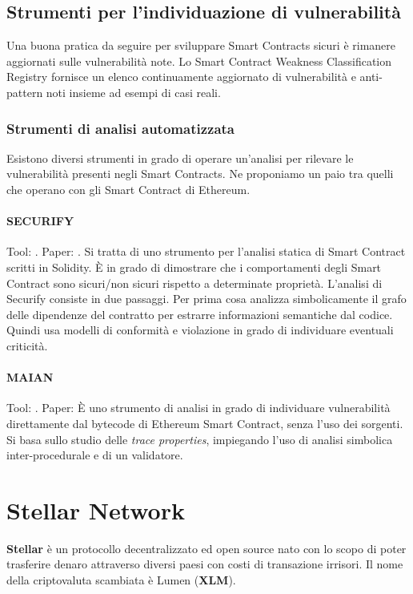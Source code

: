 \subsection{Strumenti per l'individuazione di vulnerabilità}
Una buona pratica da seguire per sviluppare Smart Contracts sicuri è
rimanere aggiornati sulle vulnerabilità note.
Lo Smart Contract Weakness Classification Registry \cite{swc-registry} fornisce un elenco
continuamente aggiornato di vulnerabilità e anti-pattern noti insieme ad esempi
di casi reali.

\subsubsection{Strumenti di analisi automatizzata}
Esistono diversi strumenti in grado di operare un'analisi per
rilevare le vulnerabilità presenti
negli Smart Contracts. Ne proponiamo un paio tra quelli che operano con
gli Smart Contract di Ethereum.

\paragraph{SECURIFY} Tool: \cite{secufiry-url}. Paper: \cite{secufiry-paper}.
Si tratta di uno strumento per l'analisi statica di Smart Contract scritti in Solidity. È in grado
di dimostrare che i comportamenti degli Smart Contract sono sicuri/non sicuri
rispetto a determinate proprietà.
L'analisi di Securify consiste in due passaggi.
Per prima cosa analizza simbolicamente il grafo delle dipendenze
del contratto per estrarre informazioni semantiche dal codice.
Quindi usa modelli di conformità e violazione
in grado di individuare eventuali criticità.

\paragraph{MAIAN} Tool: \cite{maian-url}. Paper: \cite{Nikolic2018FindingTG}
È uno strumento di analisi in grado di individuare vulnerabilità direttamente
dal bytecode di Ethereum Smart Contract, senza l'uso dei sorgenti.
Si basa sullo studio delle \textit{trace properties}, impiegando l'uso di
analisi simbolica inter-procedurale e di un validatore.


\section{Stellar Network}

\textbf{Stellar} è un protocollo decentralizzato ed
open source nato con lo scopo di poter
trasferire denaro attraverso diversi
paesi con costi di transazione irrisori. Il nome della criptovaluta scambiata
è Lumen (\textbf{XLM}).

